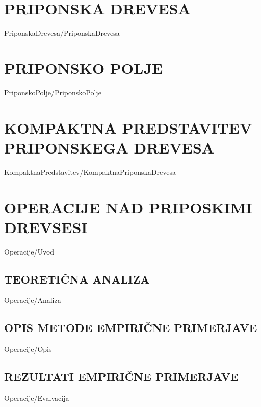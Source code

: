 \documentclass[12pt,a4paper,titlepage,openany,twoside]{report}
\begin{document}
\chapter{PRIPONSKA DREVESA}\label{sec:priponska_drevesa}
\thispagestyle{fancy} 
{PriponskaDrevesa/PriponskaDrevesa}

\chapter{PRIPONSKO POLJE}\label{sec:SA}
{PriponskoPolje/PriponskoPolje}

\chapter{KOMPAKTNA PREDSTAVITEV PRIPONSKEGA DREVESA}\label{sec:Kompaktna}
\thispagestyle{fancy} 


{KompaktnaPredstavitev/KompaktnaPriponskaDrevesa}

\chapter{OPERACIJE NAD PRIPOSKIMI DREVSESI}\label{sec:OPeracije}
\thispagestyle{fancy} 
{Operacije/Uvod}



\section{TEORETIČNA ANALIZA}\label{sec:analiza}
{Operacije/Analiza}

\section{OPIS METODE EMPIRIČNE PRIMERJAVE}\label{sec:opis}
{Operacije/Opis}


\section{REZULTATI EMPIRIČNE PRIMERJAVE}\label{sec:primerjava}
{Operacije/Evalvacija}
\end{document}
